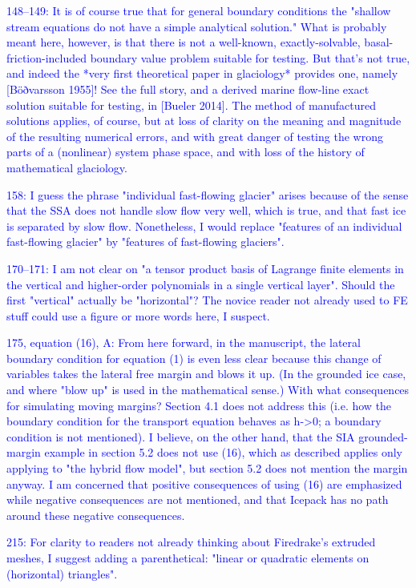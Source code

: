 \documentclass{article}
\theoremstyle{definition}
\theoremstyle{plain}
\begin{document}
\textcolor{blue}{148--149:  It is of course true that for general boundary conditions the "shallow stream equations do not have a simple analytical solution."  What is probably meant here, however, is that there is not a well-known, exactly-solvable, basal-friction-included boundary value problem suitable for testing.  But that's not true, and indeed the *very first theoretical paper in glaciology* provides one, namely [Böðvarsson 1955]!  See the full story, and a derived marine flow-line exact solution suitable for testing, in [Bueler 2014].  The method of manufactured solutions applies, of course, but at loss of clarity on the meaning and magnitude of the resulting numerical errors, and with great danger of testing the wrong parts of a (nonlinear) system phase space, and with loss of the history of mathematical glaciology.}

\textcolor{blue}{158:  I guess the phrase "individual fast-flowing glacier" arises because of the sense that the SSA does not handle slow flow very well, which is true, and that fast ice is separated by slow flow.  Nonetheless, I would replace "features of an individual fast-flowing glacier" by "features of fast-flowing glaciers".}

\textcolor{blue}{170--171:  I am not clear on "a tensor product basis of Lagrange finite elements in the vertical and higher-order polynomials in a single vertical layer".  Should the first "vertical" actually be "horizontal"?  The novice reader not already used to FE stuff could use a figure or more words here, I suspect.}

\textcolor{blue}{175, equation (16), A:  From here forward, in the manuscript, the lateral boundary condition for equation (1) is even less clear because this change of variables takes the lateral free margin and blows it up.  (In the grounded ice case, and where "blow up" is used in the mathematical sense.)  With what consequences for simulating moving margins?  Section 4.1 does not address this (i.e. how the boundary condition for the transport equation behaves as h->0; a boundary condition is not mentioned).  I believe, on the other hand, that the SIA grounded-margin example in section 5.2 does not use (16), which as described applies only applying to "the hybrid flow model", but section 5.2 does not mention the margin anyway.  I am concerned that positive consequences of using (16) are emphasized while negative consequences are not mentioned, and that Icepack has no path around these negative consequences.}

\textcolor{blue}{215:  For clarity to readers not already thinking about Firedrake's extruded meshes, I suggest adding a parenthetical: "linear or quadratic elements on (horizontal) triangles".}
\end{document}

